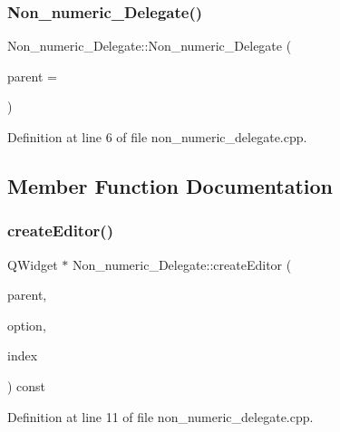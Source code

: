 \subsubsection{\texorpdfstring{Non\+\_\+numeric\+\_\+\+Delegate()}{Non\_numeric\_Delegate()}}
{\footnotesize\ttfamily Non\+\_\+numeric\+\_\+\+Delegate\+::\+Non\+\_\+numeric\+\_\+\+Delegate (\begin{DoxyParamCaption}\item[{Q\+Object $\ast$}]{parent = {} }\end{DoxyParamCaption})}



Definition at line 6 of file non\+\_\+numeric\+\_\+delegate.\+cpp.



\subsection{Member Function Documentation}
\mbox{\label{classNon__numeric__Delegate_a073f05382a36c178750c522fe82dda8d}} 
\subsubsection{\texorpdfstring{create\+Editor()}{createEditor()}}
{\footnotesize\ttfamily Q\+Widget $\ast$ Non\+\_\+numeric\+\_\+\+Delegate\+::create\+Editor (\begin{DoxyParamCaption}\item[{Q\+Widget $\ast$}]{parent,  }\item[{const Q\+Style\+Option\+View\+Item \&}]{option,  }\item[{const Q\+Model\+Index \&}]{index }\end{DoxyParamCaption}) const}



Definition at line 11 of file non\+\_\+numeric\+\_\+delegate.\+cpp.

\mbox{\label{classNon__numeric__Delegate_a8d3048dc7212637a785670aa5f5c9043}} 
